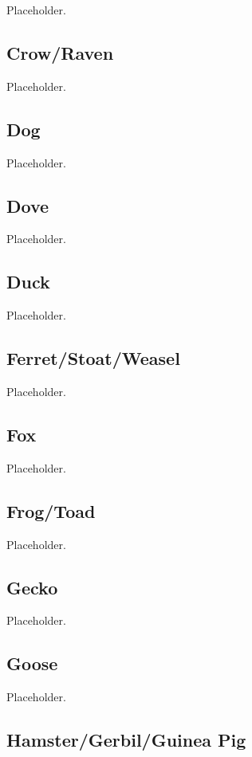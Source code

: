 Placeholder.

\subsection{Crow/Raven}

Placeholder.

\subsection{Dog}

Placeholder.

\subsection{Dove}

Placeholder.

\subsection{Duck}

Placeholder.

\subsection{Ferret/Stoat/Weasel}

Placeholder.

\subsection{Fox}

Placeholder.

\subsection{Frog/Toad}

Placeholder.

\subsection{Gecko}

Placeholder.

\subsection{Goose}

Placeholder.

\subsection{Hamster/Gerbil/Guinea Pig}

